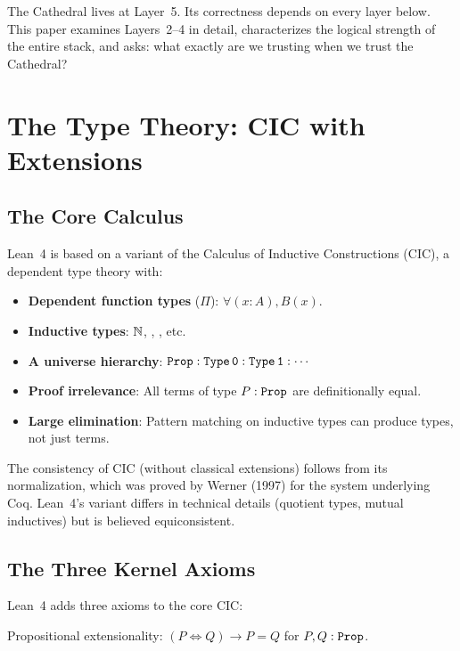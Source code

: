 \documentclass[11pt,a4paper]{article}
\begin{document}
The Cathedral lives at Layer~5. Its correctness depends on every
layer below. This paper examines Layers~2--4 in detail, characterizes
the logical strength of the entire stack, and asks: what exactly
are we trusting when we trust the Cathedral?

\section{The Type Theory: CIC with Extensions}
\label{sec:cic}

\subsection{The Core Calculus}

Lean~4 is based on a variant of the Calculus of Inductive Constructions
(CIC), a dependent type theory with:

\begin{itemize}
  \item \textbf{Dependent function types} ($\Pi$): $\forall (x : A), B(x)$.
  \item \textbf{Inductive types}: $\mathbb{N}$, , , etc.
  \item \textbf{A universe hierarchy}: $\texttt{Prop} : \texttt{Type\,0} :
    \texttt{Type\,1} : \cdots$
  \item \textbf{Proof irrelevance}: All terms of type $P : \texttt{Prop}$
    are definitionally equal.
  \item \textbf{Large elimination}: Pattern matching on inductive types
    can produce types, not just terms.
\end{itemize}

The consistency of CIC (without classical extensions) follows from
its normalization, which was proved by Werner (1997) for the system
underlying Coq. Lean~4's variant differs in technical details
(quotient types, mutual inductives) but is believed equiconsistent.

\subsection{The Three Kernel Axioms}

Lean~4 adds three axioms to the core CIC:

\begin{definition}
Propositional extensionality: $(P \iff Q) \to P = Q$ for
$P, Q : \texttt{Prop}$.
\end{definition}
\end{document}
